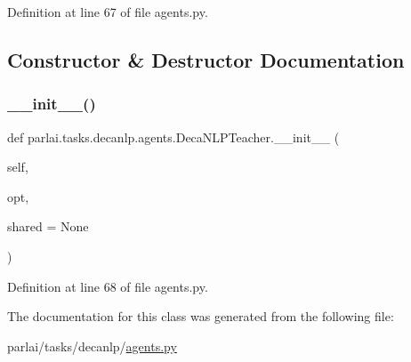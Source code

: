 Definition at line 67 of file agents.\+py.



\subsection{Constructor \& Destructor Documentation}
\mbox{\label{classparlai_1_1tasks_1_1decanlp_1_1agents_1_1DecaNLPTeacher_a2928fb06e1bf1f282b8019cc34e1d1ce}} 
\subsubsection{\texorpdfstring{\+\_\+\+\_\+init\+\_\+\+\_\+()}{\_\_init\_\_()}}
{\footnotesize\ttfamily def parlai.\+tasks.\+decanlp.\+agents.\+Deca\+N\+L\+P\+Teacher.\+\_\+\+\_\+init\+\_\+\+\_\+ (\begin{DoxyParamCaption}\item[{}]{self,  }\item[{}]{opt,  }\item[{}]{shared = {\ttfamily None} }\end{DoxyParamCaption})}



Definition at line 68 of file agents.\+py.



The documentation for this class was generated from the following file\+:\begin{DoxyCompactItemize}
\item 
parlai/tasks/decanlp/\hyperlink{parlai_2tasks_2decanlp_2agents_8py}{agents.\+py}\end{DoxyCompactItemize}
